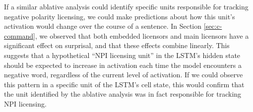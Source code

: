 \documentclass[11pt, round]{article}
\begin{document}
If a similar ablative analysis could identify specific units responsible for tracking negative polarity licensing, we could make predictions about how this unit's activation would change over the course of a sentence. In Section \ref{sec:c-command}, we observed that both embedded licensors and main licensors have a significant effect on surprisal, and that these effects combine linearly. This suggests that a hypothetical ``NPI licensing unit'' in the LSTM's hidden state should be expected to increase in activation each time the model encounters a negative word, regardless of the current level of activation. If we could observe this pattern in a specific unit of the LSTM's cell state, this would confirm that the unit identified by the ablative analysis was in fact responsible for tracking NPI licensing.


\end{document}
